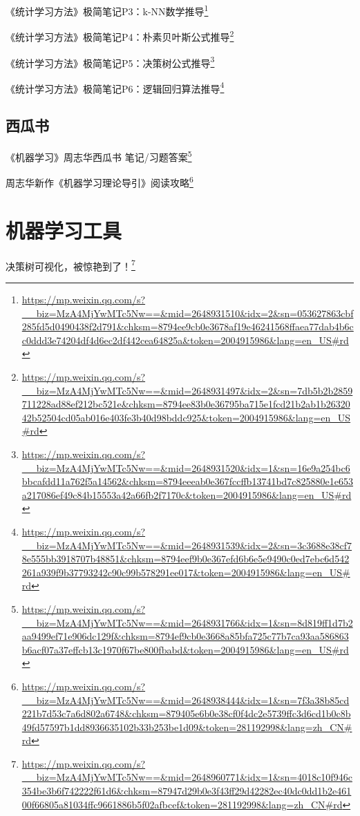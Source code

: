 \documentclass[]{ctexbook}
\renewcommand{\href}[2]{#2\footnote{\url{#1}}}
\begin{document}
\href{https://mp.weixin.qq.com/s?__biz=MzA4MjYwMTc5Nw==\&mid=2648931510\&idx=2\&sn=053627863cbf285fd5d0490438f2d791\&chksm=8794ee9cb0e3678af19e46241568ffaea77dab4b6cc0ddd3e74204df4d6ec2df442cea64825a\&token=2004915986\&lang=en_US\#rd}{《统计学习方法》极简笔记P3：k-NN数学推导}

\href{https://mp.weixin.qq.com/s?__biz=MzA4MjYwMTc5Nw==\&mid=2648931497\&idx=2\&sn=7db5b2b2859711228ad88ef212bc521e\&chksm=8794ee83b0e36795ba715e1fcd21b2ab1b2632042b52504cd05ab016e403fe3b40d98bddc925\&token=2004915986\&lang=en_US\#rd}{《统计学习方法》极简笔记P4：朴素贝叶斯公式推导}

\href{https://mp.weixin.qq.com/s?__biz=MzA4MjYwMTc5Nw==\&mid=2648931520\&idx=1\&sn=16e9a254bc6bbcafdd11a762f5a14562\&chksm=8794eeeab0e367fccffb13741bd7c825880e1e653a217086ef49c84b15553a42a66fb2f7170c\&token=2004915986\&lang=en_US\#rd}{《统计学习方法》极简笔记P5：决策树公式推导}

\href{https://mp.weixin.qq.com/s?__biz=MzA4MjYwMTc5Nw==\&mid=2648931539\&idx=2\&sn=3c3688e38cf78e555bb3918707b48851\&chksm=8794eef9b0e367efd6b6e5e9490c0ed7ebc6d542261a939f9b37793242c90c99b578291ee017\&token=2004915986\&lang=en_US\#rd}{《统计学习方法》极简笔记P6：逻辑回归算法推导}

\hypertarget{ux897fux74dcux4e66}{%
\subsection{西瓜书}\label{ux897fux74dcux4e66}}

\href{https://mp.weixin.qq.com/s?__biz=MzA4MjYwMTc5Nw==\&mid=2648931766\&idx=1\&sn=8d819ff1d7b2aa9499ef71e906dc129f\&chksm=8794ef9cb0e3668a85bfa725c77b7ca93aa586863b6acf07a37effcb13c1970f67be800fbabd\&token=2004915986\&lang=en_US\#rd}{《机器学习》周志华西瓜书 笔记/习题答案}

\href{https://mp.weixin.qq.com/s?__biz=MzA4MjYwMTc5Nw==\&mid=2648938444\&idx=1\&sn=7f3a38b85cd221b7d53c7a6d802a6748\&chksm=879405e6b0e38cf0f4dc2e5739ffc3d6cd1b0c8b49fd57597b1dd8936635102b33b253be1d09\&token=281192998\&lang=zh_CN\#rd}{周志华新作《机器学习理论导引》阅读攻略}

\hypertarget{ux673aux5668ux5b66ux4e60ux5de5ux5177}{%
\section{机器学习工具}\label{ux673aux5668ux5b66ux4e60ux5de5ux5177}}

\href{https://mp.weixin.qq.com/s?__biz=MzA4MjYwMTc5Nw==\&mid=2648960771\&idx=1\&sn=4018c10f946c354be3b6f742222f61d6\&chksm=87947d29b0e3f43ff29d42282ec40dc0dd1b2e46100f66805a81034ffc9661886b5f02afbcef\&token=281192998\&lang=zh_CN\#rd}{决策树可视化，被惊艳到了！}
\end{document}
